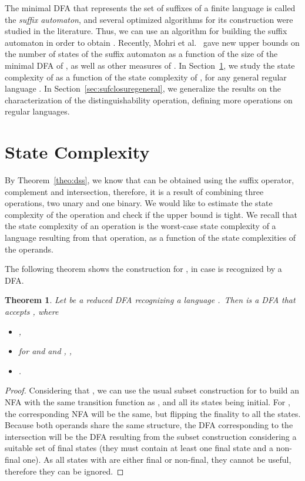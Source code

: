 \documentclass{article}
\newtheorem{theorem}{Theorem}
\newcommand{\dfa}{DFA\xspace}
\newcommand{\nfa}{NFA\xspace}
\begin{document}
The minimal \dfa that represents the set of suffixes of a finite
language  is called the \emph{suffix automaton}, and several
optimized algorithms for its construction were studied in the
literature. Thus, we can use an algorithm for building the suffix
automaton  in order to obtain . Recently, Mohri et
al.~\cite{mohri09:_gener_suffix_autom_const_algor} gave new upper
bounds on the number of states of the suffix automaton as a function
of the size of the minimal \dfa of , as well as other measures of
. In Section~\ref{ssc}, we study the state complexity of
 as a function of the state complexity of , for any general regular language . In Section~\ref{sec:sufclosuregeneral}, we generalize the results on the
characterization of the distinguishability operation, defining more operations on regular languages. 

\section{State Complexity}
\label{ssc}
By Theorem~\ref{theo:dss}, we know that  can be obtained  
using the suffix operator, complement and intersection,
therefore, it is a result of combining three operations, two unary and one binary.
We would like to estimate the state complexity of the  operation and 
check if the upper bound is tight.
We recall that the state complexity of an operation is the worst-case state complexity of a language resulting from that operation, as a function of the state complexities of the operands.
 
The following theorem shows the construction for , in case  is recognized by a \dfa.
 
\begin{theorem}
\label{theo:algodis}
  Let  be a  reduced \dfa recognizing a language .\ Then  is a \dfa that accepts , 
where 
\begin{itemize}
 \item , 
 \item for  and  and , 
,
 \item .
\end{itemize}
\end{theorem}
\begin{proof}
Considering that , we can use
the usual subset construction for  to build an \nfa
with the same transition function as , 
and all its states being initial. 
For , the corresponding \nfa will be the same, 
but flipping the finality to all the states.  
Because both operands share the same structure,
the \dfa corresponding to the intersection
 will be the \dfa resulting from the subset construction 
 considering a suitable set of final states
(they must contain at least one final state and a non-final one). 
As all states  with  are either final or non-final, 
they cannot be useful, therefore they can be ignored.
\end{proof}
\end{document}
